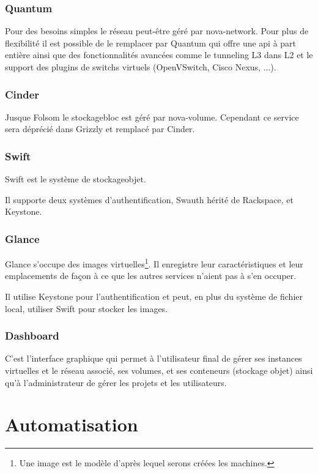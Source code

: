 \documentclass[a4paper,oneside]{report}
\begin{document}
\subsubsection{Quantum}
Pour des besoins simples le réseau peut-être géré par nova-network. Pour plus de flexibilité il  est possible de le remplacer par Quantum qui offre une \gls{api} à part entière ainsi que des fonctionnalités avancées comme le tunneling L3 dans L2 et le support des plugins de switchs virtuels (OpenVSwitch, Cisco Nexus, ...).


\subsubsection{Cinder}
Jusque Folsom le \gls{stockagebloc} est géré par nova-volume. Cependant ce service sera déprécié dans Grizzly et remplacé par Cinder.



\subsubsection{Swift}
Swift est le système de \gls{stockageobjet}. 

Il supporte deux systèmes d'authentification, Swauth hérité de Rackspace, et Keystone.

\subsubsection{Glance}
Glance s'occupe des images virtuelles\footnote{Une image est le modèle d'après lequel serons créées les machines.}.
Il enregistre leur caractéristiques et leur emplacements de façon à ce que les autres services n'aient pas à s'en occuper.

Il utilise Keystone pour l'authentification et peut, en plus du système de fichier local, utiliser Swift pour stocker les images.

\subsubsection{Dashboard}
C'est l'interface graphique qui permet à l'utilisateur final de gérer ses instances virtuelles et le réseau associé, ses volumes, et ses conteneurs (stockage objet) ainsi qu'à l'administrateur de gérer les projets et les utilisateurs.

\section{Automatisation}
\end{document}

